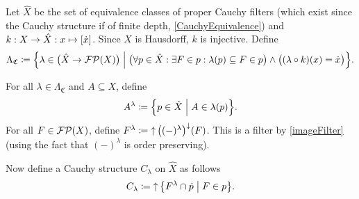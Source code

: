 Let $\hat{X}$ be the set of equivalence classes of proper Cauchy filters (which exist since the Cauchy structure if of finite depth, \ref{CauchyEquivalence}) and $k: X\to \hat{X}: x\mapsto [\dot{x}]$. Since $X$ is Hausdorff, $k$ is injective.
Define
\[ \Lambda_\mathfrak{C} \defeq \setbuilder{\lambda\in \big(\hat{X} \to \powerfilters(X)\big)}{\big(\forall p\in \hat{X}: \exists F\in p: \lambda(p) \subseteq F \in p\big) \land \big((\lambda\circ k)(x) = \pfilter{x}\big)}. \]

For all $\lambda \in \Lambda_\mathfrak{C}$ and $A\subseteq X$, define
\[ A^\lambda \defeq \setbuilder{p\in \hat{X}}{A\in \lambda(p)}. \]
For all $F\in \operatorname{\mathcal{FP}}(X)$, define $F^\lambda \coloneqq \operatorname{\uparrow} \big((-)^\lambda\big)^\downarrow(F)$. This is a filter by \ref{imageFilter} (using the fact that $(-)^\lambda$ is order preserving).

Now define a Cauchy structure $C_\lambda$ on $\hat{X}$ as follows
\[ C_\lambda \defeq \upset\setbuilder{F^\lambda \cap \pfilter{p}}{F\in p}. \]

